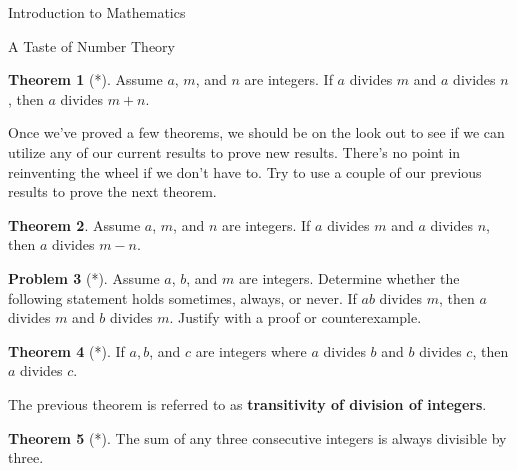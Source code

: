 \documentclass[11pt]{article}
\theoremstyle{definition}
\newtheorem{theorem}{Theorem}[section]
\newtheorem{problem}[theorem]{Problem}
\begin{document}
\begin{section}{Introduction to Mathematics}
\begin{subsection}{A Taste of Number Theory}
\begin{theorem}[*]
Assume $a$, $m$, and $n$ are integers. If $a$ divides $m$ and $a$ divides $n$, then $a$ divides $m+n$. 
\end{theorem}

Once we've proved a few theorems, we should be on the look out to see if we can utilize any of our current results to prove new results.  There's no point in reinventing the wheel if we don't have to.  Try to use a couple of our previous results to prove the next theorem.

\begin{theorem}
Assume $a$, $m$, and $n$ are integers. If $a$ divides $m$ and $a$ divides $n$, then $a$ divides $m-n$.
\end{theorem}

\begin{problem}[*]
Assume $a$, $b$, and $m$ are integers. Determine whether the following statement holds sometimes, always, or never.  If $ab$ divides $m$, then $a$ divides $m$ and $b$ divides $m$.  Justify with a proof or counterexample.
\end{problem}

\begin{theorem}[*]
If $a, b$, and $c$ are integers where $a$ divides $b$ and $b$ divides $c$, then $a$ divides $c$.
\end{theorem}

The previous theorem is referred to as \textbf{transitivity of division of integers}.

\begin{theorem}[*]
The sum of any three consecutive integers is always divisible by three.\end{theorem}

\end{subsection}

\end{section}
\end{document}

